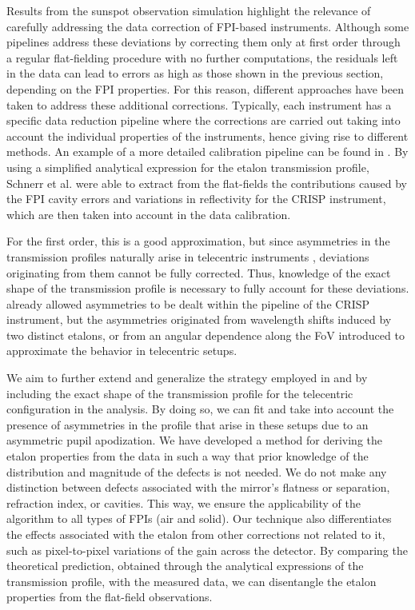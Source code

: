 Results from the sunspot observation simulation highlight the relevance of carefully addressing the data correction of FPI-based instruments. Although some pipelines address these deviations by correcting them only at first order through a regular flat-fielding procedure with no further computations, the residuals left in the data can lead to errors as high as those shown in the previous section, depending on the FPI properties. For this reason, different approaches have been taken to address these additional corrections. Typically, each instrument has a specific data reduction pipeline where the corrections are carried out taking into account the individual properties of the instruments, hence giving rise to different methods. An example of a more detailed calibration pipeline can be found in \cite{crisp-method}. By using a simplified analytical expression for the etalon transmission profile, Schnerr et al. were able to extract from the flat-fields the contributions caused by the FPI cavity errors and variations in reflectivity for the CRISP instrument, which are then taken into account in the data calibration.

For the first order, this is a good approximation, but since asymmetries in the transmission profiles naturally arise in telecentric instruments \citep{franI}, deviations originating from them cannot be fully corrected. Thus, knowledge of the exact shape of the transmission profile is necessary to fully account for these deviations. \cite{schamer_method} already allowed asymmetries to be dealt within the pipeline of the CRISP instrument, but the asymmetries originated from wavelength shifts induced by two distinct etalons, or from an angular dependence along the FoV introduced to approximate the behavior in telecentric setups.  

We aim to further extend and generalize the strategy employed in \cite{crisp-method} and \cite{schamer_method} by including the exact shape of the transmission profile for the telecentric configuration in the analysis. By doing so, we can fit and take into account the presence of asymmetries in the profile that arise in these setups due to an asymmetric pupil apodization. We have developed a method for deriving the etalon properties from the data in such a way that prior knowledge of the distribution and magnitude of the defects is not needed. We do not make any distinction between defects associated with the mirror's flatness or separation, refraction index, or cavities. This way, we ensure the applicability of the algorithm to all types of FPIs (air and solid). Our technique also differentiates the effects associated with the etalon from other corrections not related to it, such as pixel-to-pixel variations of the gain across the detector. By comparing the theoretical prediction, obtained through the analytical expressions of the transmission profile, with the measured data, we can disentangle the etalon properties from the flat-field observations. 

